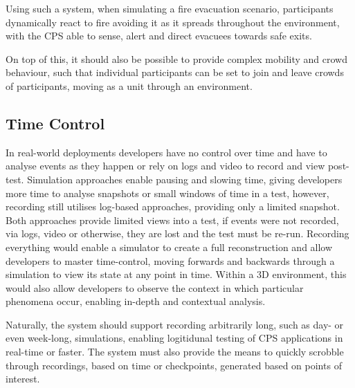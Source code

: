 Using such a system, when simulating a fire evacuation scenario, participants dynamically react to fire avoiding it as it spreads throughout the environment, with the CPS able to sense, alert and direct evacuees towards safe exits.

On top of this, it should also be possible to provide complex mobility and crowd behaviour, such that individual participants can be set to join and leave crowds of participants, moving as a unit through an environment.




\subsection{Time Control}
\label{sub:requirements_Time Control}
In real-world deployments developers have no control over time and have to analyse events as they happen or rely on logs and video to record and view post-test. Simulation approaches enable pausing and slowing time, giving developers more time to analyse snapshots or small windows of time in a test, however, recording still utilises log-based approaches, providing only a limited snapshot. Both approaches provide limited views into a test, if events were not recorded, via logs, video or otherwise, they are lost and the test must be re-run.
Recording everything would enable a simulator to create a full reconstruction and allow developers to master time-control, moving forwards and backwards through a simulation to view its state at any point in time. Within a 3D environment, this would also allow developers to observe the context in which particular phenomena occur, enabling in-depth and contextual analysis.

Naturally, the system should support recording arbitrarily long, such as day- or even week-long, simulations, enabling logitidunal testing of CPS applications in real-time or faster. The system must also provide the means to quickly scrobble through recordings, based on time or checkpoints, generated based on points of interest.

